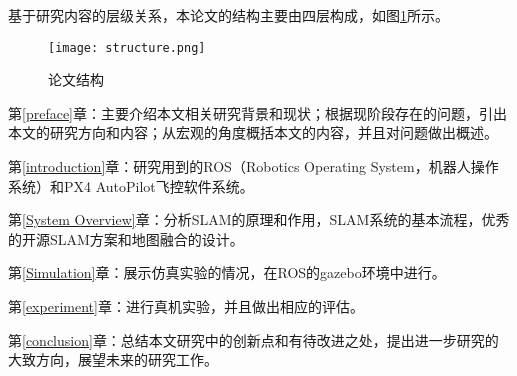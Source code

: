 基于研究内容的层级关系，本论文的结构主要由四层构成，如图\ref{fig1}所示。
\vspace{10pt}
\begin{figure}[!ht]
\centering
\texttt{[image: structure.png]}
\caption{论文结构 }
\label{fig1}
\end{figure}


第\ref{preface}章：主要介绍本文相关研究背景和现状；根据现阶段存在的问题，引出本文的研究方向和内容；从宏观的角度概括本文的内容，并且对问题做出概述。

第\ref{introduction}章：研究用到的ROS（Robotics Operating System，机器人操作系统）和PX4 AutoPilot飞控软件系统。

第\ref{System Overview}章：分析SLAM的原理和作用，SLAM系统的基本流程，优秀的开源SLAM方案和地图融合的设计。

第\ref{Simulation}章：展示仿真实验的情况，在ROS的gazebo环境中进行。

第\ref{experiment}章：进行真机实验，并且做出相应的评估。

第\ref{conclusion}章：总结本文研究中的创新点和有待改进之处，提出进一步研究的大致方向，展望未来的研究工作。

